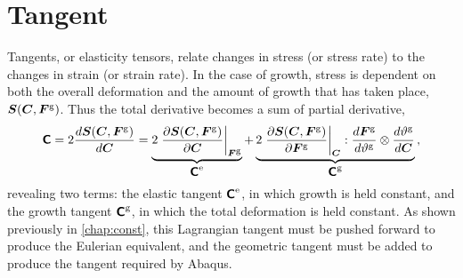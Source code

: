 \documentclass[10pt,letterpaper,oneside]{report}
\newcommand{\ten}[1]{\mbox{\boldmath $#1$}{}}
\newcommand{\tenf}[1]{\mbox{{\sffamily{\bfseries {#1}}}}}
\newcommand{\scas}[1]{\mbox{{\scriptsize{${\rm{#1}}$}}}{}}
\newcommand{\tens}[1]{\mbox{\boldmath{\scriptsize{$#1$}}}{}}
\begin{document}
\section{Tangent}
Tangents, or elasticity tensors, relate changes in stress (or stress rate) to the changes in strain (or strain rate).  In the case of growth, stress is dependent on both the overall deformation and the amount of growth that has taken place,
$\ten{S} (\ten{C}, \ten{F}^{\scas{g}}) $. Thus the total derivative becomes a sum of partial derivative, 
\begin{equation}
\tenf{C} = 2 \frac{d \ten{S} (\ten{C}, \ten{F}^{\scas{g}}) }{d \ten{C} } 
= \underbrace{ 2 \left. \frac{ \partial \ten{S} (\ten{C}, \ten{F}^{\scas{g}}) }{ \partial \ten{C} } \right|_{\tens{F}^{\scas{g}}} }_{ \tenf{C}^{\scas{e}} } + \underbrace{ 2 \left. \frac{\partial \ten{S} (\ten{C}, \ten{F}^{\scas{g}}) }{\partial \ten{F}^{\scas{g}}} \right|_{\tens{C} } : \frac{ d \ten{F}^{\scas{g}} }{ d \vartheta^{\scas{g}} } \otimes \frac{ d \vartheta^{\scas{g}} }{ d \ten{C} } }_{ \tenf{C}^{\scas{g}} } \, , 
\end{equation}
revealing two terms: the elastic tangent $\tenf{C}^{\scas{e}}$, in which growth is held constant, and the growth tangent $\tenf{C}^{\scas{g}}$, in which the total deformation is held constant.  
As shown previously in \autoref{chap:const}, this Lagrangian tangent must be pushed forward to produce the Eulerian equivalent, and the geometric tangent must be added to produce the tangent required by Abaqus.  
\end{document}
